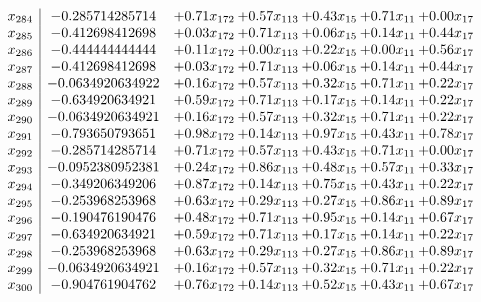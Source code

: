 \documentclass[8pt]{article}
\begin{document}
\[\begin{array}{c| c c@{\hskip 2pt} c@{\hskip 2pt} c@{\hskip 2pt} c@{\hskip 2pt} c@{\hskip 2pt} }
 x_{284}   &  -0.285714285714 & +  0.71 x_{172} & +  0.57 x_{113} & +  0.43 x_{15} & +  0.71 x_{11} & +  0.00 x_{17}\\
 x_{285}   &  -0.412698412698 & +  0.03 x_{172} & +  0.71 x_{113} & +  0.06 x_{15} & +  0.14 x_{11} & +  0.44 x_{17}\\
 x_{286}   &  -0.444444444444 & +  0.11 x_{172} & +  0.00 x_{113} & +  0.22 x_{15} & +  0.00 x_{11} & +  0.56 x_{17}\\
 x_{287}   &  -0.412698412698 & +  0.03 x_{172} & +  0.71 x_{113} & +  0.06 x_{15} & +  0.14 x_{11} & +  0.44 x_{17}\\
 x_{288}   &  -0.0634920634922 & +  0.16 x_{172} & +  0.57 x_{113} & +  0.32 x_{15} & +  0.71 x_{11} & +  0.22 x_{17}\\
 x_{289}   &  -0.634920634921 & +  0.59 x_{172} & +  0.71 x_{113} & +  0.17 x_{15} & +  0.14 x_{11} & +  0.22 x_{17}\\
 x_{290}   &  -0.0634920634921 & +  0.16 x_{172} & +  0.57 x_{113} & +  0.32 x_{15} & +  0.71 x_{11} & +  0.22 x_{17}\\
 x_{291}   &  -0.793650793651 & +  0.98 x_{172} & +  0.14 x_{113} & +  0.97 x_{15} & +  0.43 x_{11} & +  0.78 x_{17}\\
 x_{292}   &  -0.285714285714 & +  0.71 x_{172} & +  0.57 x_{113} & +  0.43 x_{15} & +  0.71 x_{11} & +  0.00 x_{17}\\
 x_{293}   &  -0.0952380952381 & +  0.24 x_{172} & +  0.86 x_{113} & +  0.48 x_{15} & +  0.57 x_{11} & +  0.33 x_{17}\\
 x_{294}   &  -0.349206349206 & +  0.87 x_{172} & +  0.14 x_{113} & +  0.75 x_{15} & +  0.43 x_{11} & +  0.22 x_{17}\\
 x_{295}   &  -0.253968253968 & +  0.63 x_{172} & +  0.29 x_{113} & +  0.27 x_{15} & +  0.86 x_{11} & +  0.89 x_{17}\\
 x_{296}   &  -0.190476190476 & +  0.48 x_{172} & +  0.71 x_{113} & +  0.95 x_{15} & +  0.14 x_{11} & +  0.67 x_{17}\\
 x_{297}   &  -0.634920634921 & +  0.59 x_{172} & +  0.71 x_{113} & +  0.17 x_{15} & +  0.14 x_{11} & +  0.22 x_{17}\\
 x_{298}   &  -0.253968253968 & +  0.63 x_{172} & +  0.29 x_{113} & +  0.27 x_{15} & +  0.86 x_{11} & +  0.89 x_{17}\\
 x_{299}   &  -0.0634920634921 & +  0.16 x_{172} & +  0.57 x_{113} & +  0.32 x_{15} & +  0.71 x_{11} & +  0.22 x_{17}\\
 x_{300}   &  -0.904761904762 & +  0.76 x_{172} & +  0.14 x_{113} & +  0.52 x_{15} & +  0.43 x_{11} & +  0.67 x_{17}\\

\end{array}\]
\end{document}
